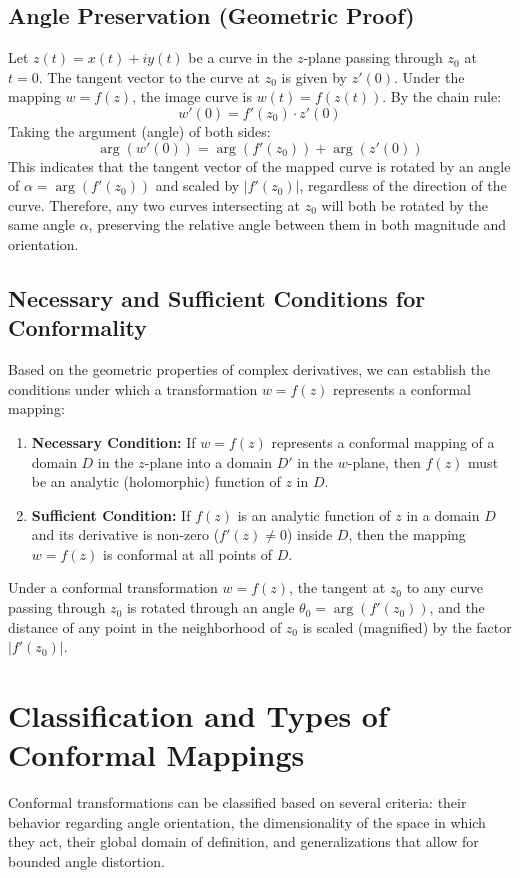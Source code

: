\documentclass[12pt,a4paper]{article}
\begin{document}
\subsection{Angle Preservation (Geometric Proof)}
Let $z(t) = x(t) + iy(t)$ be a curve in the $z$-plane passing through $z_0$ at $t = 0$. The tangent vector to the curve at $z_0$ is given by $z'(0)$. Under the mapping $w = f(z)$, the image curve is $w(t) = f(z(t))$. By the chain rule:
\begin{equation}
    w'(0) = f'(z_0) \cdot z'(0)
\end{equation}
Taking the argument (angle) of both sides:
\begin{equation}
    \arg(w'(0)) = \arg(f'(z_0)) + \arg(z'(0))
\end{equation}
This indicates that the tangent vector of the mapped curve is rotated by an angle of $\alpha = \arg(f'(z_0))$ and scaled by $|f'(z_0)|$, regardless of the direction of the curve. Therefore, any two curves intersecting at $z_0$ will both be rotated by the same angle $\alpha$, preserving the relative angle between them in both magnitude and orientation.

\subsection{Necessary and Sufficient Conditions for Conformality}
Based on the geometric properties of complex derivatives, we can establish the conditions under which a transformation $w = f(z)$ represents a conformal mapping:
\begin{enumerate}
    \item \textbf{Necessary Condition:} If $w = f(z)$ represents a conformal mapping of a domain $D$ in the $z$-plane into a domain $D'$ in the $w$-plane, then $f(z)$ must be an analytic (holomorphic) function of $z$ in $D$.
    \item \textbf{Sufficient Condition:} If $f(z)$ is an analytic function of $z$ in a domain $D$ and its derivative is non-zero ($f'(z) \neq 0$) inside $D$, then the mapping $w = f(z)$ is conformal at all points of $D$.
\end{enumerate}
Under a conformal transformation $w = f(z)$, the tangent at $z_0$ to any curve passing through $z_0$ is rotated through an angle $\theta_0 = \arg(f'(z_0))$, and the distance of any point in the neighborhood of $z_0$ is scaled (magnified) by the factor $|f'(z_0)|$.

\section{Classification and Types of Conformal Mappings}
Conformal transformations can be classified based on several criteria: their behavior regarding angle orientation, the dimensionality of the space in which they act, their global domain of definition, and generalizations that allow for bounded angle distortion.
\end{document}
